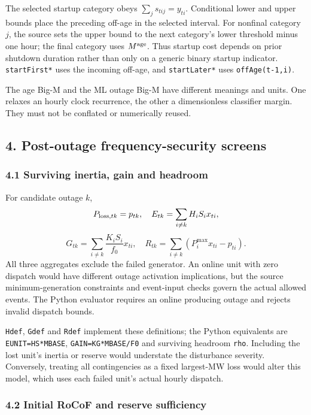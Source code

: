 \documentclass[
  11pt,
  a4paper,
]{article}
\begin{document}
The selected startup category obeys \(\sum_j s_{tij}=y_{ti}\).
Conditional lower and upper bounds place the preceding off-age in the
selected interval. For nonfinal category \(j\), the source sets the
upper bound to the next category's lower threshold minus one hour; the
final category uses \(M^{\rm age}\). Thus startup cost depends on prior
shutdown duration rather than only on a generic binary startup
indicator. \texttt{startFirst*} uses the incoming off-age, and
\texttt{startLater*} uses \texttt{offAge(t-1,i)}.

The age Big-M and the ML outage Big-M have different meanings and units.
One relaxes an hourly clock recurrence, the other a dimensionless
classifier margin. They must not be conflated or numerically reused.

\subsection{4. Post-outage frequency-security
screens}\label{post-outage-frequency-security-screens}

\subsubsection{4.1 Surviving inertia, gain and
headroom}\label{surviving-inertia-gain-and-headroom}

For candidate outage \(k\), \[
P_{{\rm loss},tk}=p_{tk},\quad E_{tk}=\sum_{i\ne k}H_iS_i x_{ti},
\] \[
G_{tk}=\sum_{i\ne k}\frac{K_iS_i}{f_0}x_{ti},\quad
R_{tk}=\sum_{i\ne k}(P_i^{\max}x_{ti}-p_{ti}).
\] All three aggregates exclude the failed generator. An online unit
with zero dispatch would have different outage activation implications,
but the source minimum-generation constraints and event-input checks
govern the actual allowed events. The Python evaluator requires an
online producing outage and rejects invalid dispatch bounds.

\texttt{Hdef}, \texttt{Gdef} and \texttt{Rdef} implement these
definitions; the Python equivalents are \texttt{EUNIT=HS*MBASE},
\texttt{GAIN=KG*MBASE/F0} and surviving headroom \texttt{rho}. Including
the lost unit's inertia or reserve would understate the disturbance
severity. Conversely, treating all contingencies as a fixed largest-MW
loss would alter this model, which uses each failed unit's actual hourly
dispatch.

\subsubsection{4.2 Initial RoCoF and reserve
sufficiency}\label{initial-rocof-and-reserve-sufficiency}
\end{document}
